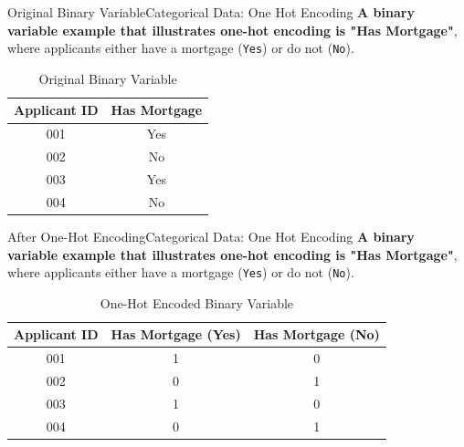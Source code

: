 \documentclass[11pt]{beamer}
\begin{document}
%
%
\begin{frame}{Original Binary Variable}{Categorical Data: One Hot Encoding}
\textbf{A binary variable example that illustrates one-hot encoding is "Has Mortgage"}, where applicants either have a mortgage (\texttt{Yes}) or do not (\texttt{No}).
    \begin{table}[]
        \centering
        \renewcommand{\arraystretch}{1.5} %
        \begin{tabular}{|c|c|}
            \hline
            \rule{0pt}{15pt} %
            \textbf{Applicant ID} & \textbf{Has Mortgage} \\
            \hline
            001 & Yes \\
            002 & No \\
            003 & Yes \\
            004 & No \\
            \hline
        \end{tabular}
        \caption{Original Binary Variable}
    \end{table}
\end{frame}
%
%
\begin{frame}{After One-Hot Encoding}{Categorical Data: One Hot Encoding}
\textbf{A binary variable example that illustrates one-hot encoding is "Has Mortgage"}, where applicants either have a mortgage (\texttt{Yes}) or do not (\texttt{No}).
    \begin{table}[]
        \centering
        \renewcommand{\arraystretch}{1.5} %
        \begin{tabular}{|c|c|c|}
            \hline
            \rule{0pt}{15pt} %
            \textbf{Applicant ID} & \textbf{Has Mortgage (Yes)} & \textbf{Has Mortgage (No)} \\
            \hline
            001 & 1 & 0 \\
            002 & 0 & 1 \\
            003 & 1 & 0 \\
            004 & 0 & 1 \\
            \hline
        \end{tabular}
        \caption{One-Hot Encoded Binary Variable}
    \end{table}
\end{frame}
%
\end{document}
